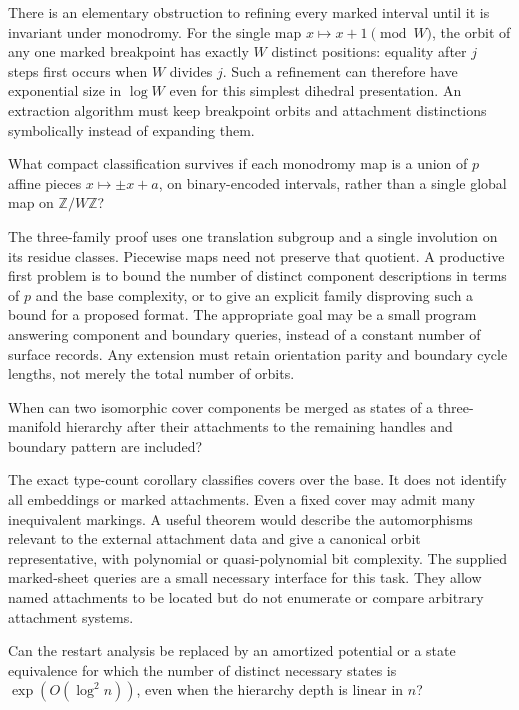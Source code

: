 There is an elementary obstruction to refining every marked interval
until it is invariant under monodromy. For the single map
$x\mapsto x+1\pmod W$, the orbit of any one marked breakpoint has
exactly $W$ distinct positions: equality after $j$ steps first occurs
when $W$ divides $j$. Such a refinement can therefore have exponential
size in $\log W$ even for this simplest dihedral presentation. An
extraction algorithm must keep breakpoint orbits and attachment
distinctions symbolically instead of expanding them.

\begin{researchquestion}
What compact classification survives if each monodromy map is a union of
$p$ affine pieces $x\mapsto\pm x+a$, on binary-encoded intervals, rather
than a single global map on $\mathbb Z/W\mathbb Z$?
\end{researchquestion}

The three-family proof uses one translation subgroup and a single
involution on its residue classes. Piecewise maps need not preserve that
quotient. A productive first problem is to bound the number of distinct
component descriptions in terms of $p$ and the base complexity, or to give
an explicit family disproving such a bound for a proposed format. The
appropriate goal may be a small program answering component and boundary
queries, instead of a constant number of surface records. Any extension
must retain orientation parity and boundary cycle lengths, not merely
the total number of orbits.

\begin{researchquestion}
When can two isomorphic cover components be merged as states of a
three-manifold hierarchy after their attachments to the remaining handles
and boundary pattern are included?
\end{researchquestion}

The exact type-count corollary classifies covers over the base. It does not
identify all embeddings or marked attachments. Even a fixed cover may
admit many inequivalent markings. A useful theorem would describe the
automorphisms relevant to the external attachment data and give a
canonical orbit representative, with polynomial or quasi-polynomial bit
complexity. The supplied marked-sheet queries are a small necessary
interface for this task. They allow named attachments to be located but
do not enumerate or compare arbitrary attachment systems.

\begin{researchquestion}
Can the restart analysis be replaced by an amortized potential or a state
equivalence for which the number of distinct necessary states is
$\exp(O(\log^2 n))$, even when the hierarchy depth is linear in $n$?
\end{researchquestion}

